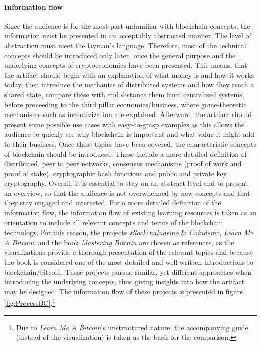 \paragraph{Information flow} Since the audience is for the most part unfamiliar with blockchain concepts, the information must be presented in an acceptably abstracted manner. The level of abstraction must meet the layman's language. Therefore, most of the technical concepts should be introduced only later, once the general purpose and the underlying concepts of cryptoeconomics have been presented. This means, that the artifact should begin with an explanation of what money is and how it works today, then introduce the mechanics of distributed systems and how they reach a shared state, compare these with and distance them from centralized systems, before proceeding to the third pillar economics/business, where game-theoretic mechanisms such as incentivization are explained. Afterward, the artifact should present some possible use cases with easy-to-grasp examples as this allows the audience to quickly see why blockchain is important and what value it might add to their business. Once these topics have been covered, the characteristic concepts of blockchain should be introduced. These include a more detailed definition of distributed, peer to peer networks, consensus mechanisms (proof of work and proof of stake), cryptographic hash functions and public and private key cryptography. Overall, it is essential to stay on an abstract level and to present an overview, so that the audience is not overwhelmed by new concepts and that they stay engaged and interested. For a more detailed definition of the information flow, the information flow of existing learning resources is taken as an orientation to include all relevant concepts and terms of the blockchain technology. For this reason, the projects \textit{Blockchaindemo} \& \textit{Coindemo}, \textit{Learn Me A Bitcoin}, and the book \textit{Mastering Bitcoin} are chosen as references, as the visualizations provide a thorough presentation of the relevant topics and because the book is considered one of the most detailed and well-written introductions to blockchain/bitcoin. These projects pursue similar, yet different approaches when introducing the underlying concepts, thus giving insights into how the artifact may be designed. The information flow of these projects is presented in figure \ref{fig:ProcessBC}.\footnote{Due to \textit{Learn Me A Bitcoin}'s unstructured nature, the accompanying guide (instead of the visualization) is taken as the basis for the comparison.} 

